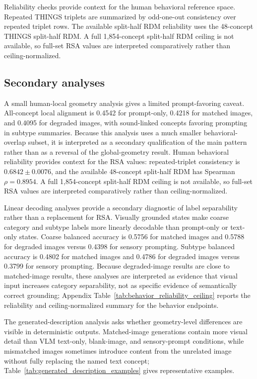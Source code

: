 \documentclass{article}
\begin{document}
Reliability checks provide context for the human behavioral reference space. Repeated THINGS triplets are summarized by odd-one-out consistency over repeated triplet rows. The available split-half RDM reliability uses the 48-concept THINGS split-half RDM. A full 1,854-concept split-half RDM ceiling is not available, so full-set RSA values are interpreted comparatively rather than ceiling-normalized.

\subsection{Secondary analyses}
\label{app:secondary_diagnostics}

A small human-local geometry analysis gives a limited prompt-favoring caveat. All-concept local alignment is 0.4542 for prompt-only, 0.4218 for matched images, and 0.4095 for degraded images, with sound-linked concepts favoring prompting in subtype summaries. Because this analysis uses a much smaller behavioral-overlap subset, it is interpreted as a secondary qualification of the main pattern rather than as a reversal of the global-geometry result. Human behavioral reliability provides context for the RSA values: repeated-triplet consistency is \(0.6842\pm0.0076\), and the available 48-concept split-half RDM has Spearman \(\rho=0.8954\). A full 1,854-concept split-half RDM ceiling is not available, so full-set RSA values are interpreted comparatively rather than ceiling-normalized.

Linear decoding analyses provide a secondary diagnostic of label separability rather than a replacement for RSA. Visually grounded states make coarse category and subtype labels more linearly decodable than prompt-only or text-only states. Coarse balanced accuracy is 0.5756 for matched images and 0.5788 for degraded images versus 0.4398 for sensory prompting. Subtype balanced accuracy is 0.4802 for matched images and 0.4786 for degraded images versus 0.3799 for sensory prompting. Because degraded-image results are close to matched-image results, these analyses are interpreted as evidence that visual input increases category separability, not as specific evidence of semantically correct grounding; Appendix Table~\ref{tab:behavior_reliability_ceiling} reports the reliability and ceiling-normalized summary for the behavior endpoints.

The generated-description analysis asks whether geometry-level differences are visible in deterministic outputs. Matched-image generations contain more visual detail than VLM text-only, blank-image, and sensory-prompt conditions, while mismatched images sometimes introduce content from the unrelated image without fully replacing the named text concept; Table~\ref{tab:generated_description_examples} gives representative examples.
\end{document}
